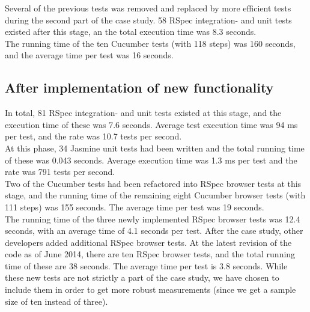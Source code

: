 Several of the previous tests was removed and replaced by more efficient
tests during the second part of the case study. 58 RSpec integration-
and unit tests existed after this stage, an the total execution time was
8.3 seconds.\\

The running time of the ten Cucumber tests (with 118 steps) was 160
seconds, and the average time per test was 16 seconds.\\


\subsection{After implementation of new functionality}

In total, 81 RSpec integration- and unit tests existed at this stage,
and the execution time of these was 7.6 seconds. Average test execution
time was 94 ms per test, and the rate was 10.7 tests per
second.\\

At this phase, 34 Jasmine unit tests had been written and the total
running time of these was 0.043 seconds. Average execution time was 1.3
ms per test and the rate was 791 tests per second.\\

Two of the Cucumber tests had been refactored into RSpec browser tests
at this stage, and the running time of the remaining eight Cucumber
browser tests (with 111 steps) was 155 seconds. The average time per
test was 19 seconds.\\

The running time of the three newly implemented RSpec browser tests was
12.4 seconds, with an average time of 4.1 seconds per test. After the
case study, other developers added additional RSpec browser tests.  At
the latest revision of the code as of June 2014, there are ten RSpec
browser tests, and the total running time of these are 38 seconds. The
average time per test is 3.8 seconds. While these new tests are not
strictly a part of the case study, we have chosen to include them in
order to get more robust measurements (since we get a sample size of ten
instead of three).\\

